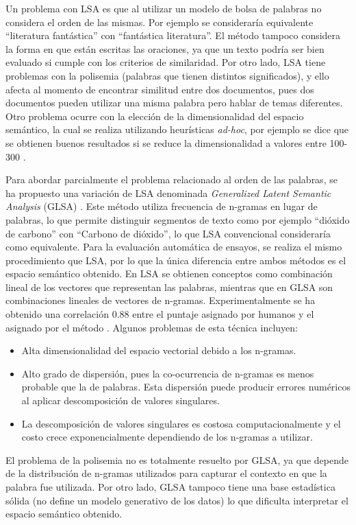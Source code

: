 \documentclass[12pt]{diicc}
\begin{document}
Un problema con LSA es que al utilizar un modelo de bolsa de palabras no considera el orden de las mismas. Por ejemplo se consideraría equivalente ``literatura fantástica'' con ``fantástica literatura''. El método tampoco considera la forma en que están escritas las oraciones, ya que  un texto podría ser bien evaluado si cumple con los criterios de similaridad. Por otro lado, LSA tiene problemas con la polisemia (palabras que tienen distintos significados), y ello afecta al momento de encontrar similitud entre dos documentos, pues dos documentos pueden utilizar una misma palabra pero hablar de temas diferentes. Otro problema ocurre con la elección de la dimensionalidad del espacio semántico, la cual se realiza utilizando heurísticas {\em ad-hoc}, por ejemplo se dice que se obtienen buenos resultados si se reduce la dimensionalidad a valores entre 100-300 \cite{t10}.

Para abordar parcialmente el problema relacionado al orden de las palabras, se ha propuesto una variación de LSA denominada {\em Generalized Latent Semantic Analysis} (GLSA) \cite{t13}. Este método utiliza frecuencia de n-gramas en lugar de palabras, lo que permite distinguir segmentos de texto como por ejemplo ``dióxido de carbono'' con ``Carbono de dióxido'', lo que LSA convencional consideraría como equivalente. Para la evaluación automática de ensayos, se realiza el mismo procedimiento que LSA, por lo que la única diferencia entre ambos métodos es el espacio semántico obtenido. En LSA se obtienen conceptos como combinación lineal de los vectores que representan las palabras, mientras que en GLSA son combinaciones lineales de vectores de n-gramas. Experimentalmente se ha obtenido una correlación 0.88 entre el puntaje asignado por humanos y el asignado por el método \cite{t13}. Algunos problemas de esta técnica incluyen:

\begin{itemize}
	\item Alta dimensionalidad del espacio vectorial debido a los n-gramas.
	\item Alto grado de dispersión, pues la co-ocurrencia de n-gramas es menos probable que la de palabras. Esta dispersión puede producir errores numéricos al aplicar descomposición de valores singulares.
	\item La descomposición de valores singulares es costosa computacionalmente y el costo crece exponencialmente dependiendo de los n-gramas a utilizar.
\end{itemize}

El problema de la polisemia no es totalmente resuelto por GLSA, ya que depende de la distribución de n-gramas utilizados para capturar el contexto en que la palabra fue utilizada. Por otro lado, GLSA tampoco tiene una base estadística sólida (no define un modelo generativo de los datos) lo que dificulta interpretar el espacio semántico obtenido. 
\end{document}
